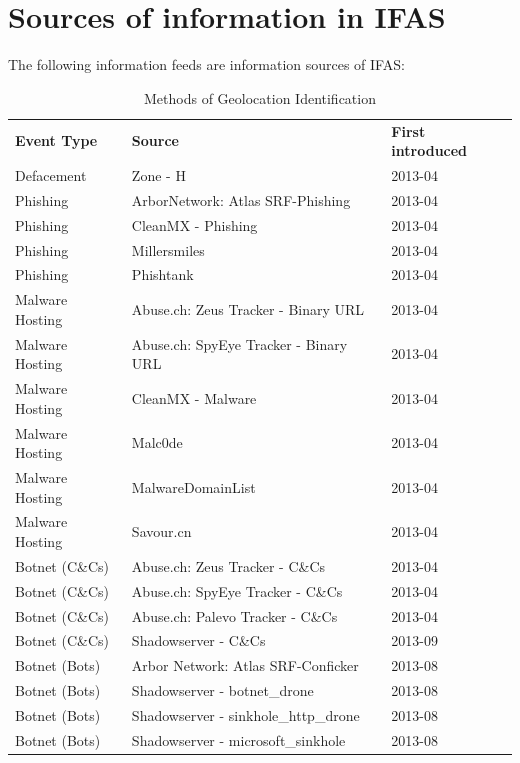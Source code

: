 \documentclass[12pt]{article}
\begin{document}
\FloatBarrier
\pagebreak
\appendix
\pagebreak
\section{Sources of information in IFAS}
The following information feeds are information sources of IFAS:
\begin{table}[!htbp]
\centering
\caption{Methods of Geolocation Identification}
\begin{tabular}{lll}
\hline
{\bf Event Type} & {\bf Source} & \bf First introduced \\\hhline{===}
Defacement & Zone - H & 2013-04
\\\hline
Phishing & ArborNetwork: Atlas SRF-Phishing & 2013-04
\\\hline
Phishing & CleanMX - Phishing & 2013-04
\\\hline
Phishing & Millersmiles & 2013-04
\\\hline
Phishing & Phishtank & 2013-04
\\\hline
Malware Hosting & Abuse.ch: Zeus Tracker - Binary URL & 2013-04
\\\hline
Malware Hosting & Abuse.ch: SpyEye Tracker - Binary URL & 2013-04
\\\hline
Malware Hosting & CleanMX - Malware & 2013-04
\\\hline
Malware Hosting & Malc0de & 2013-04
\\\hline
Malware Hosting & MalwareDomainList & 2013-04
\\\hline
Malware Hosting & Savour.cn & 2013-04
\\\hline
Botnet (C\&Cs) & Abuse.ch: Zeus Tracker - C\&Cs & 2013-04
\\\hline
Botnet (C\&Cs) & Abuse.ch: SpyEye Tracker - C\&Cs & 2013-04
\\\hline
Botnet (C\&Cs) & Abuse.ch: Palevo Tracker - C\&Cs & 2013-04
\\\hline
Botnet (C\&Cs) & Shadowserver - C\&Cs & 2013-09
\\\hline
Botnet (Bots) & Arbor Network: Atlas SRF-Conficker & 2013-08
\\\hline
Botnet (Bots) & Shadowserver - botnet\_drone & 2013-08
\\\hline
Botnet (Bots) & Shadowserver - sinkhole\_http\_drone & 2013-08
\\\hline
Botnet (Bots) & Shadowserver - microsoft\_sinkhole & 2013-08
\\\hline
\end{tabular}
\end{table}
\end{document}
